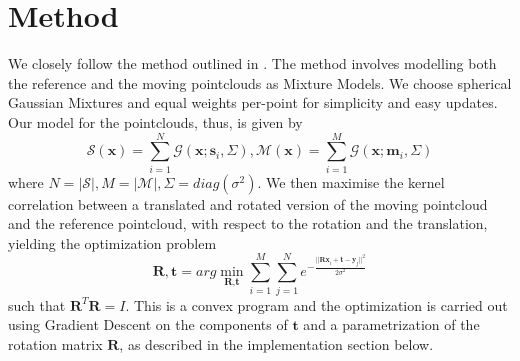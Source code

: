 \documentclass[11pt, a4paper]{article}
\begin{document}
\section{Method}
We closely follow the method outlined in \cite{main}. The method involves modelling both the reference and the moving pointclouds as Mixture Models. We choose spherical Gaussian Mixtures and equal weights per-point for simplicity and easy updates. Our model for the pointclouds, thus, is given by $$\mathcal{S}(\textbf{x}) = \sum_{i=1}^N \mathcal{G}(\textbf{x}; \textbf{s}_i, \Sigma), \mathcal{M}(\textbf{x}) = \sum_{i=1}^M \mathcal{G}(\textbf{x}; \textbf{m}_i, \Sigma)$$ where $N = |\mathcal{S}|, M = |\mathcal{M}|, \Sigma = diag(\sigma^2)$. We then maximise the kernel correlation between a translated and rotated version of the moving pointcloud and the reference pointcloud, with respect to the rotation and the translation, yielding the optimization problem $$\textbf{R}, \textbf{t} = arg\min_{\textbf{R}, \textbf{t}} \sum_{i=1}^M \sum_{j=1}^N e^{-\frac{|| \textbf{Rx}_i + \textbf{t} - \textbf{y}_j ||^2}{2 \sigma^2}}$$ such that $\textbf{R}^T \textbf{R} = I$. This is a convex program and the optimization is carried out using Gradient Descent on the components of $\textbf{t}$ and a parametrization of the rotation matrix $\textbf{R}$, as described in the implementation section below.
\end{document}
